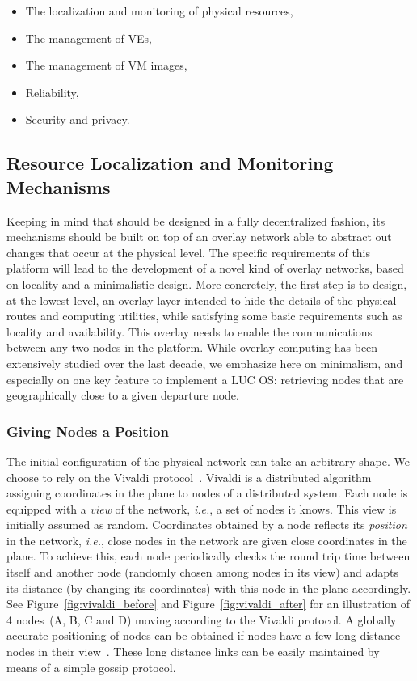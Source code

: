\begin{itemize}
\item The localization and monitoring of physical resources, 
\item The management of VEs, 
\item The management of VM images, 
\item Reliability,
\item Security and privacy.
\end{itemize}

\subsection{Resource Localization and Monitoring Mechanisms\label{ssec:p2p}}

Keeping in mind that \discovery should be designed in a fully decentralized
fashion, its mechanisms should be built on top of an overlay network able to
abstract out changes that occur at the physical level. The specific requirements
of this platform will lead to the development of a novel kind of overlay
networks, based on locality and a minimalistic design.
%
More concretely, the first step is to design, at the lowest level, an overlay
layer intended to hide the details of the physical routes and computing
utilities, while satisfying some basic requirements such as locality and
availability. This overlay needs to enable the communications between any two
nodes in the platform. While overlay computing has been extensively studied over
the last decade, we emphasize here on minimalism, and especially on one key
feature to implement a LUC OS:  retrieving nodes that are geographically close
to a given departure node.

\subsubsection*{Giving Nodes a Position}

The initial configuration of the physical network can take an arbitrary
shape. We choose to rely on the Vivaldi
protocol~\cite{dabek:2001:sigcomm04}. Vivaldi is a distributed algorithm
assigning coordinates in the plane to nodes of a distributed system. Each node
is equipped with a \emph{view} of the network, \emph{i.e.}, a set of nodes it
knows. This view is initially assumed as random. Coordinates obtained by a node
reflects its \emph{position} in the network, \emph{i.e.}, close nodes in the
network are given close coordinates in the plane. To achieve this, each node
periodically checks the round trip time between itself and another node
(randomly chosen among nodes in its view) and adapts its distance (by changing
its coordinates) with this node in the plane accordingly. See
Figure~\ref{fig:vivaldi_before} and Figure~\ref{fig:vivaldi_after} for an
illustration of 4 nodes~(A, B, C and D) moving according to the Vivaldi
protocol. 
%
A globally accurate positioning of nodes can be
obtained if nodes have a few long-distance nodes in their
view~\cite{dabek:2001:sigcomm04}. These long distance links can be easily
maintained by means of a simple gossip protocol.

